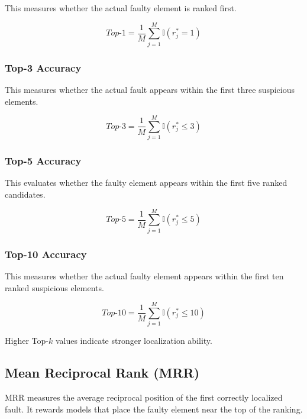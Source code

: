 \documentclass[article,article,submit,pdftex,moreauthors]{Definitions/mdpi}
\begin{document}
This measures whether the actual faulty element is ranked first.

\begin{equation}
Top\text{-}1 =
\frac{1}{M}
\sum_{j=1}^{M}
\mathbb{I}(r_j^* = 1)
\end{equation}

\subsubsection{Top-3 Accuracy}

This measures whether the actual fault appears within the first three suspicious elements.

\begin{equation}
Top\text{-}3 =
\frac{1}{M}
\sum_{j=1}^{M}
\mathbb{I}(r_j^* \leq 3)
\end{equation}

\subsubsection{Top-5 Accuracy}

This evaluates whether the faulty element appears within the first five ranked candidates.

\begin{equation}
Top\text{-}5 =
\frac{1}{M}
\sum_{j=1}^{M}
\mathbb{I}(r_j^* \leq 5)
\end{equation}

\subsubsection{Top-10 Accuracy}

This measures whether the actual faulty element appears within the first ten ranked suspicious elements.

\begin{equation}
Top\text{-}10 =
\frac{1}{M}
\sum_{j=1}^{M}
\mathbb{I}(r_j^* \leq 10)
\end{equation}

Higher Top-$k$ values indicate stronger localization ability.

\subsection{Mean Reciprocal Rank (MRR)}

MRR measures the average reciprocal position of the first correctly localized fault. It rewards models that place the faulty element near the top of the ranking.
\end{document}

